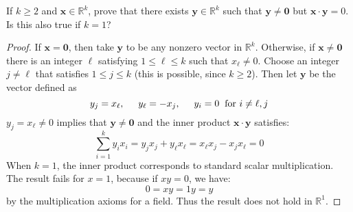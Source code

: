 \documentclass[12pt]{article}
\newenvironment{problem}[2][Problem]{\begin{trivlist}
\item[\hskip \labelsep {\bfseries #1}\hskip \labelsep {\bfseries #2.}]}{\end{trivlist}}
\begin{document}
\begin{problem}{9}

\end{problem}
\begin{problem}{10}

\end{problem}
\begin{problem}{11}

\end{problem}
\begin{problem}{12}

\end{problem}
\begin{problem}{13}

\end{problem}
\begin{problem}{14}

\end{problem}
\begin{problem}{15}

\end{problem}
\begin{problem}{16}

\end{problem}
\begin{problem}{17}

\end{problem}
\begin{problem}{18}
If $k \geq 2$ and $\mathbf{x} \in \mathbb{R}^k$, prove that there exists $\mathbf{y} \in \mathbb{R}^k$ such that $\mathbf{y} \neq \mathbf{0}$ but $\mathbf{x}\cdot \mathbf{y} = 0$.  Is this also true if $k = 1$?
\end{problem}
\begin{proof}
If $\mathbf{x} = \mathbf{0}$, then take $\mathbf{y}$ to be any nonzero vector in $\mathbb{R}^k$.  Otherwise, if $\mathbf{x} \neq \mathbf{0}$ there is an integer $\ell$ satisfying $1\leq \ell \leq k$ such that $x_{\ell} \neq 0$.  Choose an integer $j \neq \ell$ that satisfies $1\leq j \leq k$ (this is possible, since $k \geq 2$).  Then let $\mathbf{y}$ be the vector defined as
\begin{equation}
y_j = x_\ell, \hspace{5mm} y_\ell = - x_j, \hspace{5mm} y_i = 0 \hspace{2mm} \text{for} \  i\neq \ell,j
\end{equation}
$y_j = x_\ell \neq 0$ implies that $\mathbf{y} \neq \mathbf{0}$ and the inner product $\mathbf{x} \cdot \mathbf{y}$ satisfies:
\begin{equation}
\sum_{i = 1}^k y_i x_i = y_j x_j + y_\ell x_\ell = x_\ell x_j - x_j x_\ell = 0
\end{equation}
When $k = 1$, the inner product corresponds to standard scalar multiplication.  The result fails for $x = 1$, because if $xy = 0$, we have:
\begin{equation}
0 = xy = 1y = y
\end{equation}
by the multiplication axioms for a field.  Thus the result does not hold in $\mathbb{R}^1$.
\end{proof}
\begin{problem}{19}

\end{problem}
\begin{problem}{20}

\end{problem}
\end{document}
